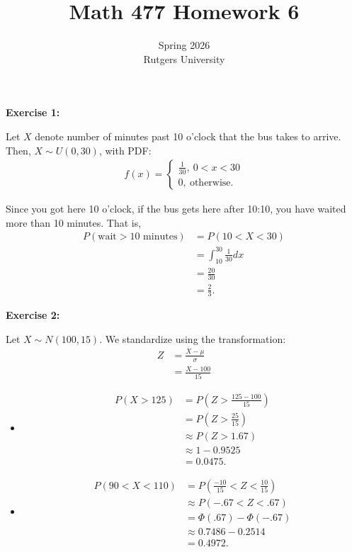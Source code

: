 \documentclass[12pt]{article}
\title{Math 477 Homework 6}
\author{Spring 2026 \\ Rutgers University}
\begin{document}
\maketitle

\noindent{}\textbf{Exercise 1:}

Let $X$ denote number of minutes past 10 o'clock that the bus takes to arrive.
Then, $X \sim U(0,30)$, with PDF:
\begin{align*}
    f(x) = \begin{cases}
               \frac{1}{30}, ~ 0 < x < 30 \\
               0, ~ \text{otherwise.}
           \end{cases}
\end{align*}

Since you got here 10 o'clock, if the bus gets here after 10:10, you have waited more than 10 minutes.
That is,
\begin{align*}
    P(\text{wait} > 10 \text{ minutes}) & = P(10 < X < 30)                 \\
                                        & = \int_{10}^{30} \frac{1}{30} dx \\
                                        & = \frac{20}{30}                  \\
                                        & = \frac{2}{3}.
\end{align*}

\noindent{}\textbf{Exercise 2:}

Let $X\sim N(100, 15)$.
We standardize using the transformation:
\begin{align*}
    Z & = \frac{X-\mu}{\sigma} \\
      & = \frac{X - 100}{15}
\end{align*}

\begin{itemize}
    \item [(a)]
          \begin{align*}
              P(X > 125) & = P(Z > \frac{125-100}{15}) \\
                         & = P(Z > \frac{25}{15})      \\
                         & \approx P(Z > 1.67)         \\
                         & \approx 1 - 0.9525          \\
                         & = 0.0475.
          \end{align*}
    \item [(b)]
          \begin{align*}
              P(90 < X < 110) & = P(\frac{-10}{15} < Z < \frac{10}{15}) \\
                              & \approx P(-.67 < Z < .67)               \\
                              & = \Phi(.67) - \Phi(-.67)                \\
                              & \approx 0.7486 - 0.2514                 \\
                              & = 0.4972.
          \end{align*}

\end{itemize}
\end{document}
